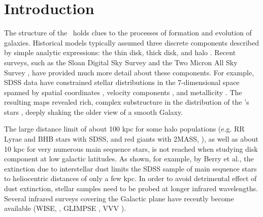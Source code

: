 \section{Introduction}

The structure of the \mw\ holds clues to the processes of formation and evolution of galaxies.
Historical models typically assumed three discrete components described by simple analytic 
expressions: the thin disk, thick disk, and halo \citep{1980ApJS...44...73B, 1989ARA&A..27..555G,1993ARA&A..31..575M}. 
Recent surveys, such as the Sloan Digital Sky Survey \citep[\sdss, ][]{2000AJ....120.1579Y} 
and the Two Micron All Sky Survey \citep[\twomass, ][]{2006AJ....131.1163S}, have provided 
much more detail about these components. For example, SDSS data have constrained stellar distributions 
in the 7-dimensional space spanned by spatial coordinates \citep{2008ApJ...673..864J}, velocity components \citep{2010ApJ...716....1B}, and metallicity \citep{2008ApJ...684..287I}. The resulting maps revealed rich, complex substructure in the distribution of the \mw's stars \citep[e.g.][]{2000AJ....120..963I,2000ApJ...540..825Y,2001ApJ...554L..33V,2002ApJ...569..245N,2003ApJ...599.1082M,2006ApJ...642L.137B,2006ApJ...651L..29G,2006AJ....132..714V}, deeply shaking the older view of a smooth Galaxy. 


The large distance limit of about 100 kpc for some halo populations (e.g. RR Lyrae and BHB stars 
with SDSS, \citealt{2010ApJ...708..717S} and red giants with 2MASS, \citealt{2003ApJ...599.1082M}), as well as about 10 kpc 
for very numerous main sequence stars, is not reached when studying disk component at low galactic
latitudes. As shown, for example, by Berry et al., the extinction due to interstellar dust limits 
the SDSS sample of main sequence stars to heliocentric distances of only a few kpc. In order
to avoid detrimental effect of dust extinction, stellar samples need to be probed at longer infrared
wavelengths. Several infrared surveys covering the Galactic plane have recently become available (WISE, \citealt{2010AJ....140.1868W, 2012wise.rept....1C}, GLIMPSE \citealt{2009PASP..121..213C, 2003PASP..115..953B}, VVV \citealt{2012A&A...537A.107S}).

